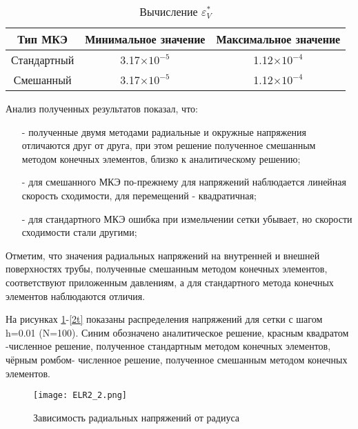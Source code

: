 \documentclass[a4paper,14pt]{extarticle}
\begin{document}
\begin{spacing}{1.0}
\newpage

\begin{table}
\caption{Вычисление $\varepsilon^{*}_V$}
\label{tabl:EpsV2}
\begin{center}
\begin{tabular}{|c|c|c|}
\hline
Тип МКЭ & Минимальное значение & Максимальное значение \\
\hline
Стандартный & 3.17$\times 10^{-5}$ & 1.12$\times 10^{-4}$ \\
\hline
Смешанный & 3.17$\times 10^{-5}$ &  1.12$\times 10^{-4}$ \\
\hline
\end{tabular}
\end{center}
\end{table}
 
\end{spacing}

Анализ полученных результатов показал, что:
\begin{itemize}
\item[-]полученные двумя методами радиальные и окружные напряжения отличаются друг от друга, при этом решение полученное смешанным методом конечных элементов, близко к аналитическому решению;
\item[-]для смешанного МКЭ по-прежнему для напряжений наблюдается линейная скорость сходимости, для перемещений - квадратичная;
\item[-]для стандартного МКЭ ошибка при измельчении сетки убывает, но скорости сходимости стали другими;
\end{itemize}

Отметим, что значения радиальных напряжений на внутренней и внешней поверхностях трубы, полученные смешанным методом конечных элементов, соответствуют приложенным давлениям, а для стандартного метода конечных элементов наблюдаются отличия.  

На рисунках \ref{2r}-\ref{2t} показаны распределения напряжений для сетки с шагом h=0.01 (N=100). Синим обозначено аналитическое решение, красным квадратом -численное решение, полученное стандартным методом конечных элементов, чёрным ромбом- численное решение, полученное смешанным методом конечных элементов. 

\newpage
\begin{figure}[h]
\begin{center}
\texttt{[image: ELR2\_2.png]}
\caption{Зависимость радиальных напряжений от радиуса}
\label{2r}
\end{center}
\end{figure}
\end{document}
